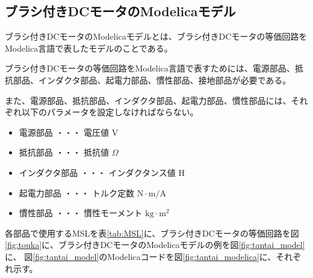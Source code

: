 \subsection{ブラシ付きDCモータのModelicaモデル}\label{sub:tanntai}
ブラシ付きDCモータのModelicaモデルとは、ブラシ付きDCモータの等価回路\cite{等価回路}をModelica言語で表したモデルのことである。

ブラシ付きDCモータの等価回路をModelica言語で表すためには、電源部品、抵抗部品、インダクタ部品、起電力部品、慣性部品、接地部品が必要である。

また、電源部品、抵抗部品、インダクタ部品、起電力部品、慣性部品には、それぞれ以下のパラメータを設定しなければならない。
\begin{itemize}
	\item 電源部品 ・・・ 電圧値 V
	\item 抵抗部品 ・・・ 抵抗値 $\Omega$
	\item インダクタ部品 ・・・ インダクタンス値 H
	\item 起電力部品 ・・・ トルク定数 $\mathrm{N\cdot m/A}$
	\item 慣性部品 ・・・ 慣性モーメント $\mathrm{kg\cdot m^2}$
\end{itemize}

各部品で使用するMSLを表\ref{tab:MSL}に、ブラシ付きDCモータの等価回路を図\ref{fig:touka}に、ブラシ付きDCモータのModelicaモデルの例を図\ref{fig:tantai_model}に、
図\ref{fig:tantai_model}のModelicaコードを図\ref{fig:tantai_modelica}に、それぞれ示す。

